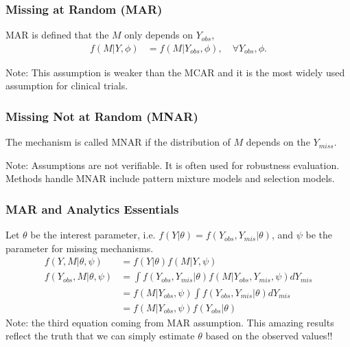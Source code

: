 \documentclass[notes=no]{beamer}
\begin{document}
\begin{frame}
	\frametitle{Missing at Random (MAR)}
	\begin{definition}[MAR]
	MAR is defined that the $M$ only depends on $Y_{obs}$,
	\begin{align*}
	f(M | Y, \phi) &= f(M|Y_{obs}, \phi), \quad \forall Y_{obs}, \phi.
	\end{align*}
	\end{definition}
	Note: This assumption is weaker than the MCAR and it is the most widely used assumption for clinical trials.
\end{frame}

\begin{frame}
	\frametitle{Missing Not at Random (MNAR)}
	\begin{definition}[MNAR]
	The mechanism is called MNAR if the distribution of $M$ depends on the $Y_{miss}$.	
	\end{definition}
Note: Assumptions are not verifiable. It is often used for robustness evaluation. Methods handle MNAR include pattern mixture models and selection models.	
\end{frame}

\begin{frame}
	\frametitle{MAR and Analytics Essentials}
	Let $\theta$ be the interest parameter, i.e. $f(Y|\theta) = f(Y_{obs}, Y_{mis}|\theta)$, and $\psi$ be the parameter for missing mechanisms. 
	\begin{align*}
	f(Y,M|\theta, \psi) &= f(Y|\theta) f(M|Y,\psi)\\
	f(Y_{obs},M|\theta, \psi)&= \int f(Y_{obs}, Y_{mis}|\theta) f(M|Y_{obs}, Y_{mis},\psi) d Y_{mis} \\
	&= f(M|Y_{obs}, \psi) \int f(Y_{obs},Y_{mis}|\theta) dY_{mis}\\
	&= f(M|Y_{obs}, \psi) f(Y_{obs}|\theta)
	\end{align*}
Note: the third equation coming from MAR assumption.  This amazing results reflect the truth that we can simply estimate $\theta$ based on the observed values!!	
\end{frame}
\end{document}
